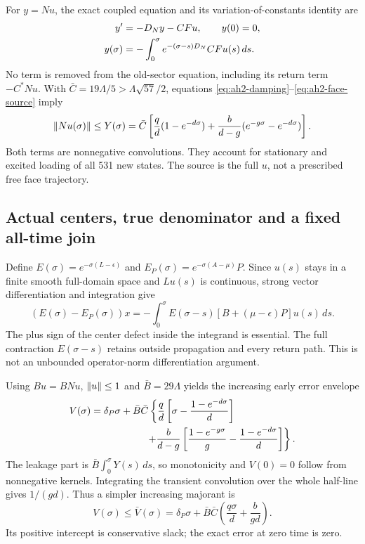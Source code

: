 For $y=Nu$, the exact coupled equation and its variation-of-constants identity are
\begin{align}
 y'&=-D_Ny-CFu,\qquad y(0)=0,\notag\\
 y(\sigma)&=-\int_0^\sigma e^{-(\sigma-s)D_N}CFu(s)\,ds.
 \label{eq:ah2-loading}
\end{align}
No term is removed from the old-sector equation, including its return term $-C^*Nu$. With $\bar C=19\Lambda/5>\Lambda\sqrt{57}/2$, equations \eqref{eq:ah2-damping}--\eqref{eq:ah2-face-source} imply
\begin{equation}
 \left\lVert Nu(\sigma)\right\rVert\le Y(\sigma)
 =\bar C\left[\frac qd(1-e^{-d\sigma})+
 \frac b{d-g}(e^{-g\sigma}-e^{-d\sigma})\right].
 \label{eq:ah2-Y}
\end{equation}
Both terms are nonnegative convolutions. They account for stationary and excited loading of all 531 new states. The source is the full $u$, not a prescribed free face trajectory.

\subsection{Actual centers, true denominator and a fixed all-time join}
Define $E(\sigma)=e^{-\sigma(L-\epsilon)}$ and $E_P(\sigma)=e^{-\sigma(A-\mu)}P$. Since $u(s)$ stays in a finite smooth full-domain space and $Lu(s)$ is continuous, strong vector differentiation and integration give
\begin{equation}
 (E(\sigma)-E_P(\sigma))x
 =-\int_0^\sigma E(\sigma-s)
 [B+(\mu-\epsilon)P]u(s)\,ds.
 \label{eq:ah2-duhamel}
\end{equation}
The plus sign of the center defect inside the integrand is essential. The full contraction $E(\sigma-s)$ retains outside propagation and every return path. This is not an unbounded operator-norm differentiation argument.

Using $Bu=BNu$, $\left\lVert u\right\rVert\le1$ and $\bar B=29\Lambda$ yields the increasing early error envelope
\begin{align}
 V(\sigma)={}&\delta_P\sigma+\bar B\bar C
 \left\{\frac qd\left[\sigma-\frac{1-e^{-d\sigma}}d\right]\right.\notag\\
 &\left.\hspace{15mm}+\frac b{d-g}
 \left[\frac{1-e^{-g\sigma}}g-\frac{1-e^{-d\sigma}}d\right]\right\}.
 \label{eq:ah2-V}
\end{align}
The leakage part is $\bar B\int_0^\sigma Y(s)\,ds$, so monotonicity and $V(0)=0$ follow from nonnegative kernels. Integrating the transient convolution over the whole half-line gives $1/(gd)$. Thus a simpler increasing majorant is
\begin{equation}
 V(\sigma)\le\bar V(\sigma)
 =\delta_P\sigma+\bar B\bar C
 \left(\frac{q\sigma}d+\frac b{gd}\right).
 \label{eq:ah2-affine}
\end{equation}
Its positive intercept is conservative slack; the exact error at zero time is zero.

